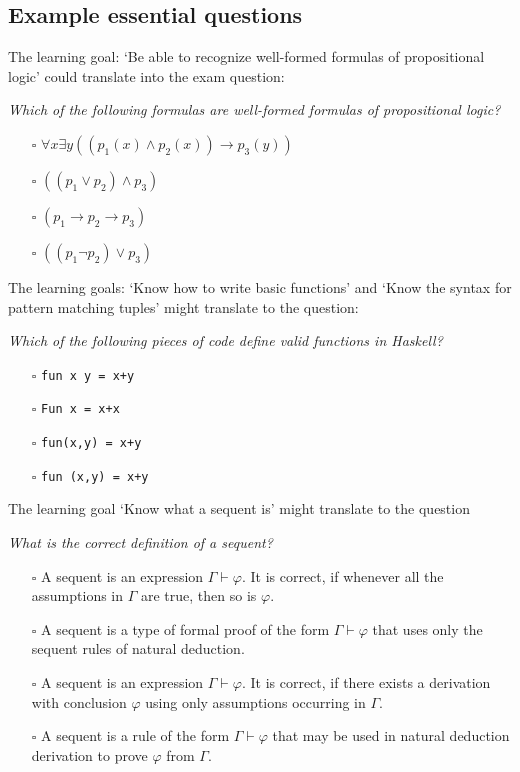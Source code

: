 \documentclass{article}[12pt]
\begin{document}
\subsection{Example essential questions}
The learning goal: `Be able to recognize well-formed formulas of propositional logic' could translate into the exam question:

\emph{Which of the following formulas are well-formed formulas of propositional logic?}
\begin{itemize}
    \item[$\square$] $\forall x \exists y ((p_1(x) \wedge p_2(x) ) \rightarrow p_3(y))$
    \item[$\square$] $ ((p_1 \vee p_2) \wedge p_3) $
    \item[$\square$] $ (p_1 \rightarrow p_2 \rightarrow p_3)$
    \item[$\square$] $ ((p_1 \neg p_2) \vee p_3 )$
\end{itemize}

The learning goals: `Know how to write basic functions' and `Know the syntax for pattern matching tuples' might translate to the question:

\emph{Which of the following pieces of code define valid functions in Haskell?}
\begin{itemize}
    \item[$\square$] \verb|fun x y = x+y|
    \item[$\square$] \verb|Fun x = x+x|
    \item[$\square$] \verb|fun(x,y) = x+y|
    \item[$\square$] \verb|fun (x,y) = x+y|
\end{itemize}

The learning goal `Know what a sequent is' might translate to the question

\emph{What is the correct definition of a sequent?}
\begin{itemize}
    \item[$\square$] A sequent is an expression $\Gamma \vdash \varphi$. It is correct, if whenever all the assumptions in $\Gamma$ are true, then so is $\varphi$.
    \item[] \item[$\square$]  A sequent is a type of formal proof of the form $\Gamma \vdash \varphi$ that uses only the sequent rules of natural deduction.
    \item[$\square$] A sequent is an expression $\Gamma \vdash \varphi$. It is correct, if there exists a derivation with conclusion $\varphi$ using only assumptions occurring in $\Gamma$.
    \item[$\square$]  A sequent is a rule of the form $\Gamma \vdash \varphi$ that may be used in natural deduction derivation to prove $\varphi$ from $\Gamma$.
\end{itemize}
\end{document}
